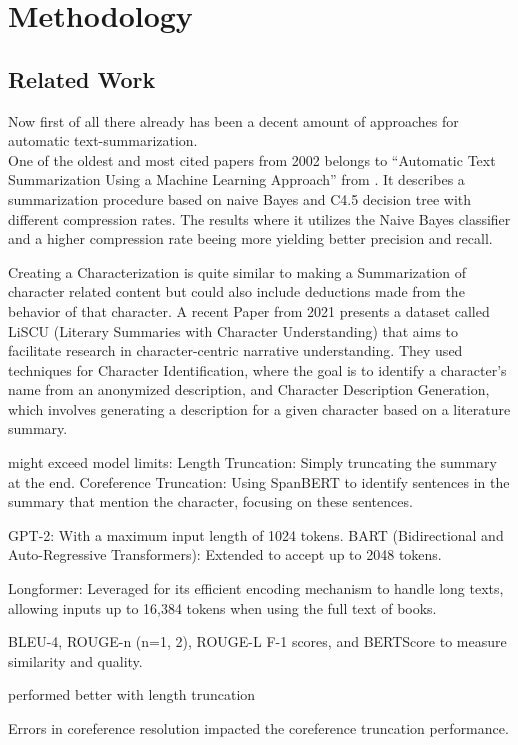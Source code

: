 \chapter{Methodology}
\section{Related Work}
Now first of all there already has been a decent amount of approaches for automatic text-summarization.\\
One of the oldest and most cited papers from 2002 belongs to ``Automatic Text Summarization Using a Machine Learning Approach'' from \cite{10.1007/3-540-36127-8_20}. It describes a summarization procedure based on naive Bayes and C4.5 decision tree with different compression rates. The results where it utilizes the Naive Bayes classifier and a higher compression rate beeing more yielding better precision and recall.

Creating a Characterization is quite similar to making a Summarization of character related content but could also include deductions made from the behavior of that character.
A recent Paper from 2021 \cite{brahman-etal-2021-characters-tell} presents a dataset called LiSCU (Literary Summaries with Character Understanding) that aims to facilitate research in character-centric narrative understanding. They used techniques for Character Identification, where the goal is to identify a character's name from an anonymized description, and Character Description Generation, which involves generating a description for a given character based on a literature summary. 

might exceed model limits:
Length Truncation: Simply truncating the summary at the end.
Coreference Truncation: Using SpanBERT to identify sentences in the summary that mention the character, focusing on these sentences.



GPT-2: With a maximum input length of 1024 tokens.
BART (Bidirectional and Auto-Regressive Transformers): Extended to accept up to 2048 tokens.


Longformer: Leveraged for its efficient encoding mechanism to handle long texts, allowing inputs up to 16,384 tokens when using the full text of books.

BLEU-4, ROUGE-n (n=1, 2), ROUGE-L F-1 scores, and BERTScore to measure similarity and quality.


performed better with length truncation

Errors in coreference resolution impacted the coreference truncation performance.



